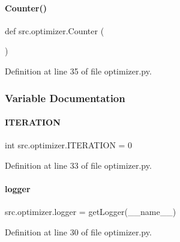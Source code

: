 \paragraph{\texorpdfstring{Counter()}{Counter()}}
{\footnotesize\ttfamily def src.\+optimizer.\+Counter (\begin{DoxyParamCaption}{ }\end{DoxyParamCaption})}



Definition at line 35 of file optimizer.\+py.



\subsubsection{Variable Documentation}
\mbox{\label{namespacesrc_1_1optimizer_a2840034b3c8de5e870ef0a94f2bee036}} 
\paragraph{\texorpdfstring{I\+T\+E\+R\+A\+T\+I\+ON}{ITERATION}}
{\footnotesize\ttfamily int src.\+optimizer.\+I\+T\+E\+R\+A\+T\+I\+ON = 0}



Definition at line 33 of file optimizer.\+py.

\mbox{\label{namespacesrc_1_1optimizer_a6c5ebe2ba6e560bc794c92485c5acfa8}} 
\paragraph{\texorpdfstring{logger}{logger}}
{\footnotesize\ttfamily src.\+optimizer.\+logger = get\+Logger(\+\_\+\+\_\+name\+\_\+\+\_\+)}



Definition at line 30 of file optimizer.\+py.

